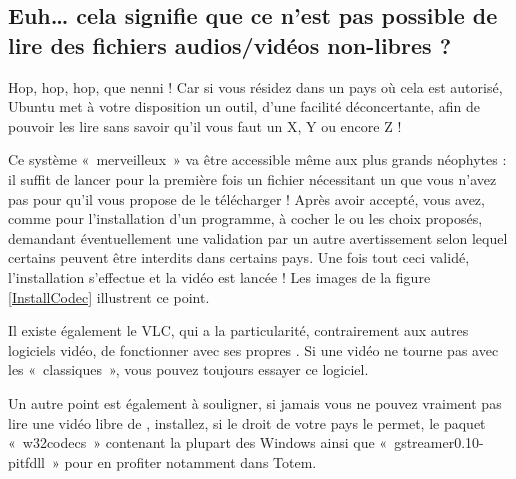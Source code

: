 \subsection{Euh\ldots{} cela signifie que ce n'est pas possible de lire des fichiers audios/vidéos non-libres ?}
\label{RefInstallCodec}
Hop, hop, hop, que nenni ! Car si vous résidez dans un pays où cela est autorisé, Ubuntu met à votre disposition un outil, d'une facilité déconcertante, afin de pouvoir les lire sans savoir qu'il vous faut un  X, Y ou encore Z !\par
Ce système «~merveilleux~» va être accessible même aux plus grands néophytes : il suffit de lancer pour la première fois un fichier nécessitant un  que vous n'avez pas pour qu'il vous propose de le télécharger ! Après avoir accepté, vous avez, comme pour l'installation d'un programme, à cocher le ou les choix proposés, demandant éventuellement une validation par un autre avertissement selon lequel certains  peuvent être interdits dans certains pays. Une fois tout ceci validé, l'installation s'effectue et la vidéo est lancée ! Les images de la figure \ref{InstallCodec} illustrent ce point.\par
\InstallationCodec
\begin{nota}
Il existe également le  VLC, qui a la particularité, contrairement aux autres logiciels vidéo, de fonctionner avec ses propres . Si une vidéo ne tourne pas avec les  «~classiques~», vous pouvez toujours essayer ce logiciel.
\end{nota}
\begin{nota}
Un autre point est également à souligner, si jamais vous ne pouvez vraiment pas lire une vidéo libre de , installez, si le droit de votre pays le permet, le paquet «~w32codecs~» contenant la plupart des  Windows ainsi que «~gstreamer0.10-pitfdll~» pour en profiter notamment dans Totem.
\end{nota}
